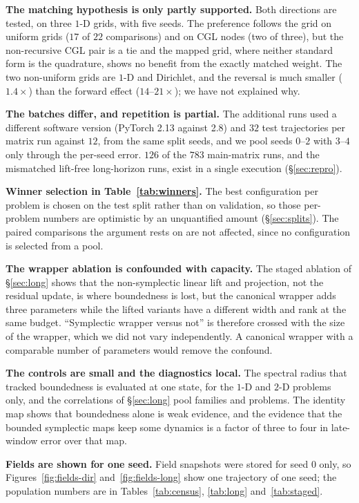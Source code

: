 \documentclass[11pt]{article}
\theoremstyle{definition}
\theoremstyle{remark}
\begin{document}
\textbf{The matching hypothesis is only partly supported.} Both directions are
tested, on three $1$-D grids, with five seeds. The preference follows the grid
on uniform grids ($17$ of $22$ comparisons) and on CGL nodes (two of three), but
the non-recursive CGL pair is a tie and the mapped grid, where neither standard
form is the quadrature, shows no benefit from the exactly matched weight. The two
non-uniform grids are $1$-D and Dirichlet, and the reversal is much smaller ($1.4\times$)
than the forward effect ($14$--$21\times$); we have not explained why.

\textbf{The batches differ, and repetition is partial.} The additional runs used
a different software version (PyTorch 2.13 against 2.8) and $32$ test trajectories
per matrix run against $12$, from the same split seeds, and we pool seeds $0$--$2$
with $3$--$4$ only through the per-seed error. $126$ of the $783$ main-matrix
runs, and the mismatched lift-free long-horizon runs, exist in a single execution
(\S\ref{sec:repro}).

\textbf{Winner selection in Table~\ref{tab:winners}.} The best configuration per
problem is chosen on the test split rather than on validation, so those
per-problem numbers are optimistic by an unquantified amount
(\S\ref{sec:splits}). The paired comparisons the argument rests on are not
affected, since no configuration is selected from a pool.

\textbf{The wrapper ablation is confounded with capacity.} The staged ablation of
\S\ref{sec:long} shows that the non-symplectic linear lift and projection, not the
residual update, is where boundedness is lost, but the canonical wrapper adds
three parameters while the lifted variants have a different width and rank at the
same budget. ``Symplectic wrapper versus not'' is therefore crossed with the size
of the wrapper, which we did not vary independently. A canonical wrapper with a
comparable number of parameters would remove the confound.

\textbf{The controls are small and the diagnostics local.} The spectral radius
that tracked boundedness is evaluated at one state, for the $1$-D and $2$-D
problems only, and the correlations of \S\ref{sec:long} pool families and
problems. The identity map shows that boundedness alone is weak evidence, and the
evidence that the bounded symplectic maps keep some dynamics is a factor of three
to four in late-window error over that map.

\textbf{Fields are shown for one seed.} Field snapshots were stored for seed $0$
only, so Figures~\ref{fig:fields-dir} and~\ref{fig:fields-long} show one
trajectory of one seed; the population numbers are in Tables~\ref{tab:census},
\ref{tab:long} and~\ref{tab:staged}.
\end{document}
